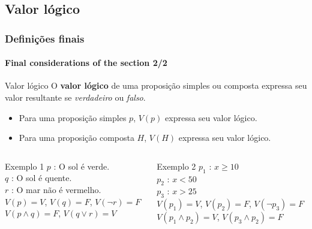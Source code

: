 \documentclass[10pt, headsepline, captions=tableabove, xcolor=table]{beamer}
\begin{document}
\subsection{Valor lógico}
%
\begin{frame}[t]
    \frametitle{Definições finais}
    \framesubtitle{Final considerations of the section 2/2}
    \small
    \begin{block}{Valor lógico}
        O \textbf{valor lógico} de uma proposição simples ou composta expressa seu valor resultante se \textit{verdadeiro} ou \textit{falso}.
        \begin{itemize}
            \item Para uma proposição simples $p$, $V(p)$ expressa seu valor lógico.
            \item Para uma proposição composta $H$, $V(H)$ expressa seu valor lógico.
        \end{itemize}
    \end{block}
    \begin{columns}[T]
        \begin{column}{.5\textwidth}
            \begin{exampleblock}{Exemplo 1}
                \quad $p$ : O sol é verde. \\
                \quad $q$ : O sol é quente. \\
                \quad $r$ : O mar não é vermelho.\\[4pt]
                \quad $V(p) = V$, $V(q) = F$, $V(\lnot r)=F$ \\
                \quad $V(p \land q) = F$, \quad $V(q \lor r) = V$
            \end{exampleblock}
        \end{column}
        \begin{column}{.5\textwidth}
            \begin{exampleblock}{Exemplo 2}
                \quad $p_1$ : $x \geq 10$   \\
                \quad $p_2$ : $x < 50$\\
                \quad $p_3$ : $x > 25$ \\[4pt]
                $V(p_1) = V$, $V(p_2) = F$, $V(\lnot p_3)=F$ \\
                \quad $V(p_1 \land p_2) = V$, $V(p_3 \land p_2) = F$
            \end{exampleblock}
        \end{column}
    \end{columns}
\end{frame}
%
\end{document}
